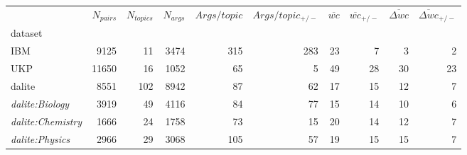 \begin{tabular}{lrrrrrrrrr}
\toprule
{} &  $N_{pairs}$ &  $N_{topics}$ &  $N_{args}$ &  $Args/topic$ &  
$Args/topic_{+/-}$ 
&  
$\overline{wc}$ &  $\overline{wc}_{+/-}$ &  $\overline{\Delta wc}$ &  
 $\overline{\Delta wc}_{+/-}$ \\
dataset          &          &           &         &             &                 &          &         &               &              \\
\midrule
IBM              &     9125 &        11 &    3474 &         315 &             283 &       23 &       7 &             3 &            2 \\
UKP              &    11650 &        16 &    1052 &          65 &               5 &       49 &      28 &            30 &           23 \\
dalite           &     8551 &       102 &    8942 &          87 &              62 &       17 &      15 &            12 &            7 \\
\textit{dalite:Biology}   &     3919 &        49 &    4116 &          84 
&              77 &       15 &      14 &            10 &            6 \\
\textit{dalite:Chemistry} &     1666 &        24 &    1758 &          73 
&              15 &       20 &      14 &            12 &            7 \\
\textit{dalite:Physics}   &     2966 &        29 &    3068 &         105 
&              57 &       19 &      15 &            15 &            7 \\
\bottomrule
\end{tabular}
